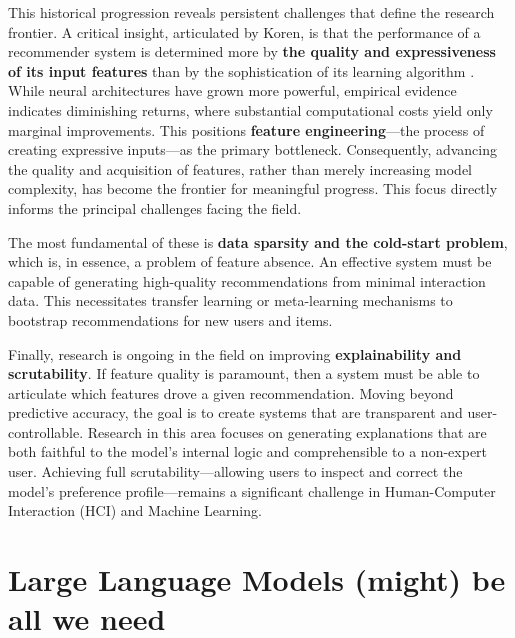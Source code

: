 This historical progression reveals persistent challenges that define the research frontier. A critical insight, articulated by Koren, is that the performance of a recommender system is determined more by \textbf{the quality and expressiveness of its input features} than by the sophistication of its learning algorithm \cite{koren2009matrix}. While neural architectures have grown more powerful, empirical evidence indicates diminishing returns, where substantial computational costs yield only marginal improvements. This positions \textbf{feature engineering}---the process of creating expressive inputs---as the primary bottleneck. Consequently, advancing the quality and acquisition of features, rather than merely increasing model complexity, has become the frontier for meaningful progress. This focus directly informs the principal challenges facing the field.

The most fundamental of these is \textbf{data sparsity and the cold-start problem}, which is, in essence, a problem of feature absence. An effective system must be capable of generating high-quality recommendations from minimal interaction data. This necessitates transfer learning or meta-learning mechanisms to bootstrap recommendations for new users and items.

Finally, research is ongoing in the field on improving \textbf{explainability and scrutability}. If feature quality is paramount, then a system must be able to articulate which features drove a given recommendation. Moving beyond predictive accuracy, the goal is to create systems that are transparent and user-controllable. Research in this area focuses on generating explanations that are both faithful to the model's internal logic and comprehensible to a non-expert user. Achieving full scrutability---allowing users to inspect and correct the model's preference profile---remains a significant challenge in Human-Computer Interaction (HCI) and Machine Learning.



\section{Large Language Models (might) be all we need}

